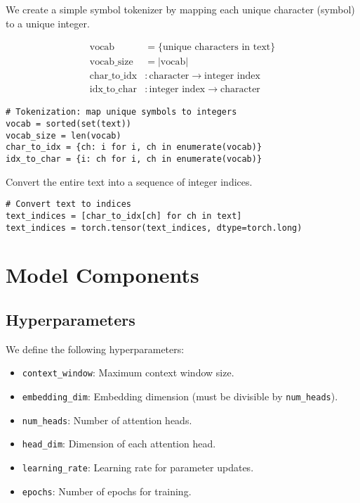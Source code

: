\documentclass{article}
\begin{document}
We create a simple symbol tokenizer by mapping each unique character (symbol) to a unique integer.

\begin{align*}
    \text{vocab} &= \{\text{unique characters in text}\} \\
    \text{vocab\_size} &= |\text{vocab}| \\
    \text{char\_to\_idx} &: \text{character} \rightarrow \text{integer index} \\
    \text{idx\_to\_char} &: \text{integer index} \rightarrow \text{character}
\end{align*}

\begin{lstlisting}[style=pythonstyle]
# Tokenization: map unique symbols to integers
vocab = sorted(set(text))
vocab_size = len(vocab)
char_to_idx = {ch: i for i, ch in enumerate(vocab)}
idx_to_char = {i: ch for i, ch in enumerate(vocab)}
\end{lstlisting}

Convert the entire text into a sequence of integer indices.

\begin{lstlisting}[style=pythonstyle]
# Convert text to indices
text_indices = [char_to_idx[ch] for ch in text]
text_indices = torch.tensor(text_indices, dtype=torch.long)
\end{lstlisting}

\section{Model Components}

\subsection{Hyperparameters}

We define the following hyperparameters:

\begin{itemize}
    \item \texttt{context\_window}: Maximum context window size.
    \item \texttt{embedding\_dim}: Embedding dimension (must be divisible by \texttt{num\_heads}).
    \item \texttt{num\_heads}: Number of attention heads.
    \item \texttt{head\_dim}: Dimension of each attention head.
    \item \texttt{learning\_rate}: Learning rate for parameter updates.
    \item \texttt{epochs}: Number of epochs for training.
\end{itemize}
\end{document}
